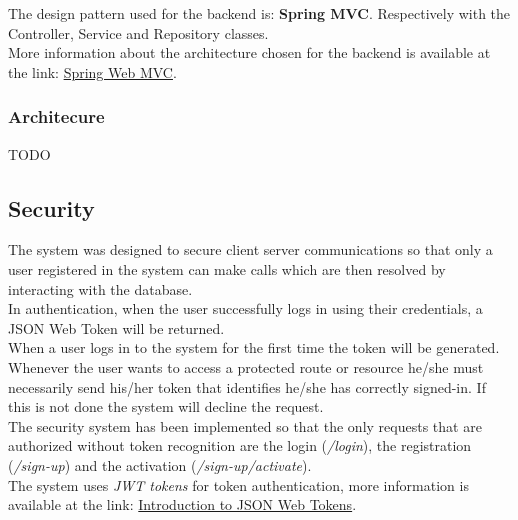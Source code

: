 The design pattern used for the backend is: \textbf{Spring MVC}.
Respectively with the Controller, Service and Repository classes.
\\ 
More information about the architecture chosen for the backend is available at the link: \href{https://docs.spring.io/spring/docs/current/spring-framework-reference/web.html}{Spring Web MVC}.

\subsubsection{Architecure}
\begin{huge}
TODO
\end{huge}
\subsection{Security}
The system was designed to secure client server communications so that only a user registered in the system can make calls which are then resolved by interacting with the database.\\
In authentication, when the user successfully logs in using their credentials, a JSON Web Token will be returned.\\
When a user logs in to the system for the first time the token will be generated.\\
Whenever the user wants to access a protected route or resource he/she must necessarily send his/her token that identifies he/she has correctly signed-in. If this is not done the system will decline the request.\\
The security system has been implemented so that the only requests that are authorized without token recognition are the login (\textit{/login}), the registration (\textit{/sign-up}) and the activation (\textit{/sign-up/activate}).\\
The system uses \textit{JWT tokens} for token authentication, more information is available at the link: \href{https://jwt.io/introduction/}{Introduction to JSON Web Tokens}.

